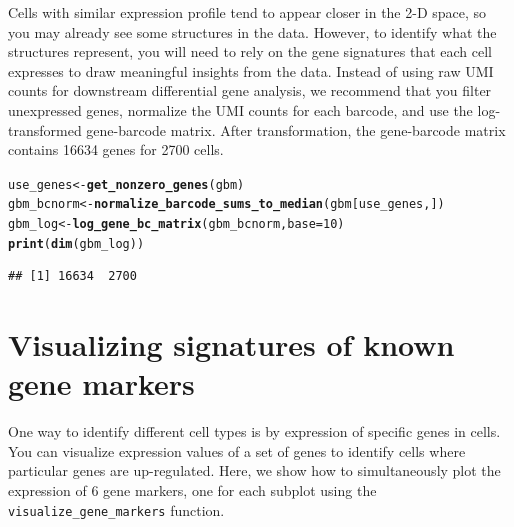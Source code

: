 \documentclass[10pt,oneside]{article}\usepackage[]{graphicx}\usepackage[]{color}
\makeatletter
\newcommand{\hlnum}[1]{\textcolor[rgb]{0.686,0.059,0.569}{#1}}%
\newcommand{\hlstd}[1]{\textcolor[rgb]{0.345,0.345,0.345}{#1}}%
\newcommand{\hlkwb}[1]{\textcolor[rgb]{0.69,0.353,0.396}{#1}}%
\newcommand{\hlkwc}[1]{\textcolor[rgb]{0.333,0.667,0.333}{#1}}%
\newcommand{\hlkwd}[1]{\textcolor[rgb]{0.737,0.353,0.396}{\textbf{#1}}}%
\newenvironment{kframe}{%
 \def\at@end@of@kframe{}%
 \ifinner\ifhmode%
  \def\at@end@of@kframe{\end{minipage}}%
  \begin{minipage}{\columnwidth}%
 \fi\fi%
 \def\FrameCommand##1{\hskip\@totalleftmargin \hskip-\fboxsep
 \colorbox{shadecolor}{##1}\hskip-\fboxsep
     \hskip-\linewidth \hskip-\@totalleftmargin \hskip\columnwidth}%
 \MakeFramed {\advance\hsize-\width
   \@totalleftmargin\z@ \linewidth\hsize
   \@setminipage}}%
 {\par\unskip\endMakeFramed%
 \at@end@of@kframe}
\newenvironment{knitrout}{}{} %
\makeatother
\begin{document}
Cells with similar expression profile tend to appear closer in the 2-D space, so you may already see some structures in the data. However, to identify what the structures represent, you will need to rely on the gene signatures that each cell expresses to draw meaningful insights from the data. Instead of using raw UMI counts for downstream differential gene analysis, we recommend that you filter unexpressed genes, normalize the UMI counts for each barcode, and use the log-transformed gene-barcode matrix. After transformation, the gene-barcode matrix contains 16634 genes for 2700 cells.
\begin{knitrout}
\color{fgcolor}\begin{kframe}
\begin{alltt}
\hlstd{use_genes} \hlkwb{<-} \hlkwd{get_nonzero_genes}\hlstd{(gbm)}
\hlstd{gbm_bcnorm} \hlkwb{<-} \hlkwd{normalize_barcode_sums_to_median}\hlstd{(gbm[use_genes,])}
\hlstd{gbm_log} \hlkwb{<-} \hlkwd{log_gene_bc_matrix}\hlstd{(gbm_bcnorm,}\hlkwc{base}\hlstd{=}\hlnum{10}\hlstd{)}
\hlkwd{print}\hlstd{(}\hlkwd{dim}\hlstd{(gbm_log))}
\end{alltt}
\begin{verbatim}
## [1] 16634  2700
\end{verbatim}
\end{kframe}
\end{knitrout}

\vspace{0.5in}
\section{Visualizing signatures of known gene markers}
One way to identify different cell types is by expression of specific genes in cells. You can visualize expression values of a set of genes to identify cells where particular genes are up-regulated. Here, we show how to simultaneously plot the expression of 6 gene markers, one for each subplot using the \verb!visualize_gene_markers! function.
\end{document}
